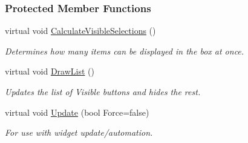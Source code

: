 \subsubsection*{Protected Member Functions}
\begin{DoxyCompactItemize}
\item 
\hypertarget{classphys_1_1UI_1_1ListBox_a8922aa7cdc3feb854a6c849b071fc8f6}{
virtual void \hyperlink{classphys_1_1UI_1_1ListBox_a8922aa7cdc3feb854a6c849b071fc8f6}{CalculateVisibleSelections} ()}
\label{classphys_1_1UI_1_1ListBox_a8922aa7cdc3feb854a6c849b071fc8f6}

\begin{DoxyCompactList}\small\item\em Determines how many items can be displayed in the box at once. \item\end{DoxyCompactList}\item 
\hypertarget{classphys_1_1UI_1_1ListBox_a4cc701e644aec861743ceff8bfc8793a}{
virtual void \hyperlink{classphys_1_1UI_1_1ListBox_a4cc701e644aec861743ceff8bfc8793a}{DrawList} ()}
\label{classphys_1_1UI_1_1ListBox_a4cc701e644aec861743ceff8bfc8793a}

\begin{DoxyCompactList}\small\item\em Updates the list of Visible buttons and hides the rest. \item\end{DoxyCompactList}\item 
\hypertarget{classphys_1_1UI_1_1ListBox_ac278c07a77081774369f76a4c7b12760}{
virtual void \hyperlink{classphys_1_1UI_1_1ListBox_ac278c07a77081774369f76a4c7b12760}{Update} (bool Force=false)}
\label{classphys_1_1UI_1_1ListBox_ac278c07a77081774369f76a4c7b12760}

\begin{DoxyCompactList}\small\item\em For use with widget update/automation. \item\end{DoxyCompactList}\end{DoxyCompactItemize}
